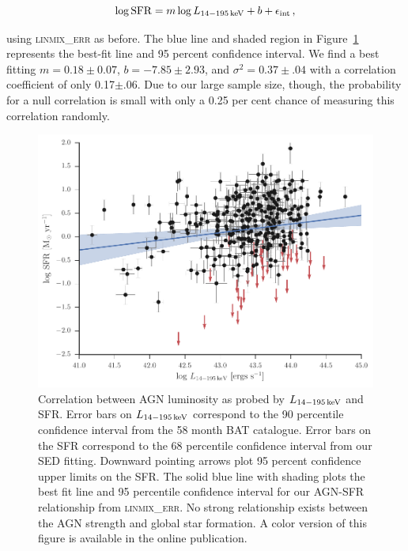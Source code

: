 \documentclass[fleqn, usenatbib]{mnras}
\begin{document}
\begin{equation}
\log {\rm SFR} = m\log L_{\rm 14-195\,keV} + b + \epsilon_{\rm int}\,,
\end{equation}

\noindent using \textsc{linmix\_err} as before. The blue line and shaded region in Figure~\ref{fig:sfr_lbat_correlation} represents the best-fit line and 95 percent confidence interval. We find a best fitting $m=0.18\pm0.07$, $b=-7.85\pm2.93$, and $\sigma^2=0.37\pm.04$ with a correlation coefficient of only 0.17$\pm$.06. Due to our large sample size, though, the probability for a null correlation is small with only a 0.25 per cent chance of measuring this correlation randomly.

\begin{figure}
\includegraphics{figures/sfr_lbat_correlation_nosy}
\caption{Correlation between AGN luminosity as probed by $L_{\rm 14-195\,keV}$ and SFR. Error bars on $L_{\rm14-195\,keV}$ correspond to the 90 percentile confidence interval from the 58 month BAT catalogue. Error bars on the SFR correspond to the 68 percentile confidence interval from our SED fitting. Downward pointing arrows plot 95 percent confidence upper limits on the SFR. The solid blue line with shading plots the best fit line and 95 percentile confidence interval for our AGN-SFR relationship from \textsc{linmix\_err}. No strong relationship exists between the AGN strength and global star formation. A color version of this figure is available in the online publication.\label{fig:sfr_lbat_correlation}}
\end{figure}
\end{document}
